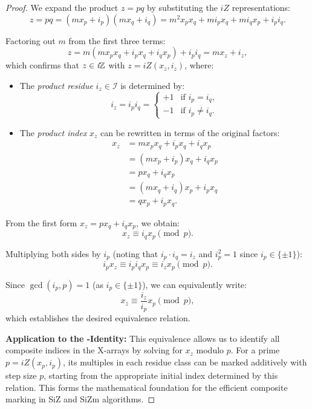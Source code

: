 \documentclass{article}
\begin{document}
\begin{proof} \label{proof:iZ}
We expand the product $z = pq$ by substituting the $iZ$ representations:
\[
z = pq = (m x_p + i_p)(m x_q + i_q) = m^2 x_p x_q + m i_p x_q + m i_q x_p + i_p i_q.
\]

\noindent 
Factoring out $m$ from the first three terms:
\[
z = m (m x_p x_q + i_p x_q + i_q x_p) + i_p i_q = m x_z + i_z,
\]
which confirms that $z \in \textit{i}\mathbb{Z}$ with $z = iZ(x_z, i_z)$, where:

\begin{itemize}[leftmargin=*,noitemsep]
    \item The \emph{product residue} $i_z \in \mathcal{I}$ is determined by:
    $$
    i_z = i_p i_q = \begin{cases}
    +1 & \text{if } i_p = i_q,\\
    -1 & \text{if } i_p \neq i_q.
    \end{cases}
    $$
    
    \item The \emph{product index} $x_z$ can be rewritten in terms of the original factors:
    \begin{align*}
    x_z &= m x_p x_q + i_p x_q + i_q x_p \\
        &= (m x_p + i_p) x_q + i_q x_p \\
        &= p x_q + i_q x_p \\
        &= (m x_q + i_q) x_p + i_p x_q \\
        &= q x_p + i_p x_q.
    \end{align*}
\end{itemize}

\noindent
From the first form $x_z = p x_q + i_q x_p$, we obtain:
$$
x_z \equiv i_q x_p \pmod{p}.
$$

\noindent
Multiplying both sides by $i_p$ (noting that $i_p \cdot i_q = i_z$ and $i_p^2 = 1$ since $i_p \in \{\pm 1\}$):
$$
i_p x_z \equiv i_p i_q x_p \equiv i_z x_p \pmod{p}.
$$

\noindent
Since $\gcd(i_p, p) = 1$ (as $i_p \in \{\pm 1\}$), we can equivalently write:
$$
x_z \equiv \frac{i_z}{i_p} x_p \pmod{p},
$$
which establishes the desired equivalence relation.

\medskip
\noindent
\textbf{Application to the \Xp-Identity:} This equivalence allows us to identify all composite indices in the X-arrays by solving for $x_z$ modulo $p$. For a prime $p = iZ(x_p, i_p)$, its multiples in each residue class can be marked additively with step size $p$, starting from the appropriate initial index determined by this relation. This forms the mathematical foundation for the efficient composite marking in SiZ and SiZm algorithms.
\end{proof}
\end{document}
